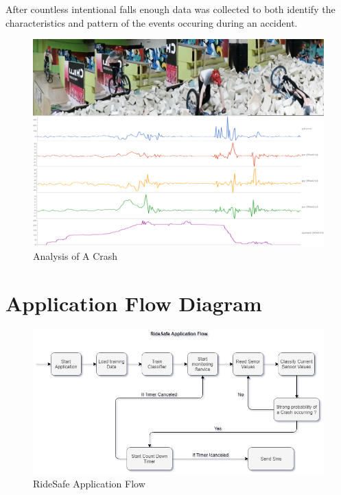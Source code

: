 After countless intentional falls enough data was collected to both identify the characteristics and pattern of the events occuring during an accident.  




\begin{figure}[h]
      \centering
      \includegraphics[scale = .6]{implementation/fall.png}
      \caption{Analysis of A Crash}
      \label{fall}
\end{figure}

\newpage
\section {Application Flow Diagram}


\begin{figure}[h]
      \centering
      \includegraphics[scale = .6]{implementation/flow.jpg}
      \caption{RideSafe Application Flow}
      \label{flow1111}
\end{figure}






